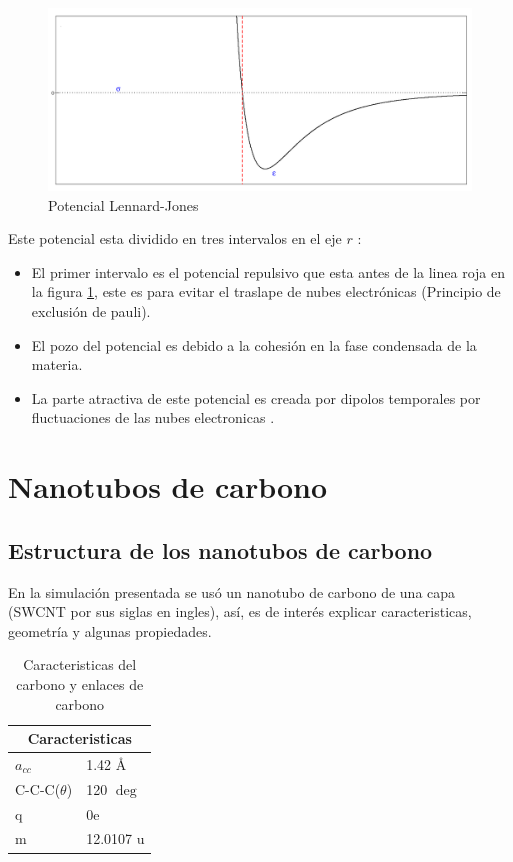 \begin{figure}[!h]
    \centering
    \includegraphics[width=1\textwidth,keepaspectratio=true]{LJ.png}
    \caption{Potencial Lennard-Jones}
    \label{fig:LJ126}
\end{figure}

\newpage

Este potencial esta dividido en tres intervalos en el eje $r$ \cite{ADAMS2001763}:

\begin{itemize}
    \item El primer intervalo es el potencial repulsivo que esta antes de la linea roja en la figura \ref{fig:LJ126}, este es para evitar el traslape de nubes electrónicas (Principio de exclusión de pauli).
    \item El pozo del potencial es debido a la cohesión en la fase condensada de la materia.
    \item La parte atractiva de este potencial es creada por dipolos temporales por fluctuaciones de las nubes electronicas \cite{INOUE2011157}.
\end{itemize}

\begingroup
\let\clearpage\relax
\chapter{Nanotubos de carbono}
\endgroup

\section{Estructura de los nanotubos de carbono}

En la simulación presentada se usó un nanotubo de carbono de una capa (SWCNT por sus siglas en ingles), así, es de interés explicar caracteristicas, geometría y algunas propiedades.\\

\begin{table}[h!]
    \centering
    \begin{tabular}{ |p{2cm}|p{3cm}|  }
    \hline
    \multicolumn{2}{|c|}{Caracteristicas} \\
    \hline
    $a_{cc}$   & 1.42 \AA \\
    \hline
    C-C-C($\theta$)   & 120 $\deg$ \\
    \hline
    q & 0e \\
    \hline
    m   & 12.0107 u \\
    \hline
    \end{tabular}
    \caption{Caracteristicas del carbono y enlaces de carbono \cite{Melendez2016}}
    \label{carbono}
\end{table}

